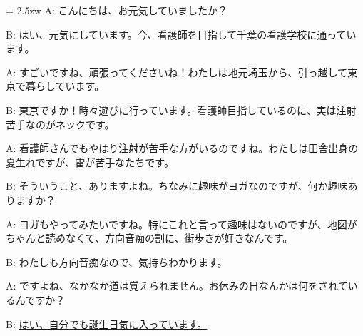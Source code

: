 \documentclass[11pt]{amsart}
\title{}
\author{}
\newenvironment{hangall}[1]{\hangindent = 2.5zw\everypar{\hangindent = 2.5zw}}{}
\begin{document}
\maketitle
\begin{hangall}{}%
A: こんにちは、お元気していましたか？

B: はい、元気にしています。今、看護師を目指して千葉の看護学校に通っています。

A: すごいですね、頑張ってくださいね！わたしは地元埼玉から、引っ越して東京で暮らしています。

B: 東京ですか！時々遊びに行っています。看護師目指しているのに、実は注射苦手なのがネックです。

A: 看護師さんでもやはり注射が苦手な方がいるのですね。わたしは田舎出身の夏生れですが、雷が苦手なたちです。

B: そういうこと、ありますよね。ちなみに趣味がヨガなのですが、何か趣味ありますか？

A: ヨガもやってみたいですね。特にこれと言って趣味はないのですが、地図がちゃんと読めなくて、方向音痴の割に、街歩きが好きなんです。

B: わたしも方向音痴なので、気持ちわかります。

A: ですよね、なかなか道は覚えられません。お休みの日なんかは何をされているんですか？

B: \ul{はい、自分でも誕生日気に入っています。}\end{hangall}
\end{document}
